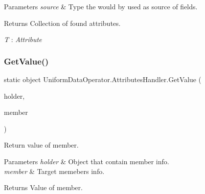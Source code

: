 \begin{DoxyParams}{Parameters}
{\em source} & Type the would by used as source of fields.\\
\hline
\end{DoxyParams}
\begin{DoxyReturn}{Returns}
Collection of found attributes.
\end{DoxyReturn}
\begin{Desc}
\item[Type Constraints]\begin{description}
\item[{\em T} : {\em Attribute}]\end{description}
\end{Desc}
\mbox{\label{class_uniform_data_operator_1_1_attributes_handler_aca737c7e65bf12379f107fb1b77cf8e3}} 
\subsubsection{\texorpdfstring{Get\+Value()}{GetValue()}}
{\footnotesize\ttfamily static object Uniform\+Data\+Operator.\+Attributes\+Handler.\+Get\+Value (\begin{DoxyParamCaption}\item[{object}]{holder,  }\item[{Member\+Info}]{member }\end{DoxyParamCaption})\hspace{0.3cm}{\ttfamily [static]}}



Return value of member. 


\begin{DoxyParams}{Parameters}
{\em holder} & Object that contain member info.\\
\hline
{\em member} & Target memeber\textquotesingle{}s info.\\
\hline
\end{DoxyParams}
\begin{DoxyReturn}{Returns}
Value of member.
\end{DoxyReturn}
\mbox{\label{class_uniform_data_operator_1_1_attributes_handler_a83786a45a828f4c0584dc3e48dba9dfd}} 
